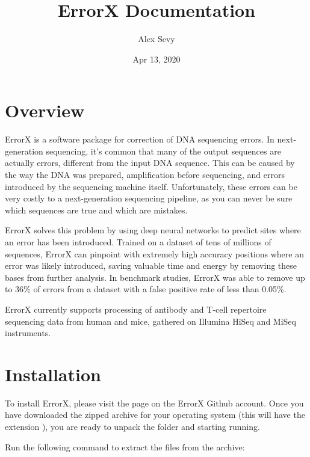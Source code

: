 \documentclass[letterpaper,10pt,english]{sphinxmanual}
\title{ErrorX Documentation}
\date{Apr 13, 2020}
\author{Alex Sevy}
\begin{document}
\pagestyle{empty}
\sphinxmaketitle
\pagestyle{plain}
\sphinxtableofcontents
\pagestyle{normal}
\label{\detokenize{index::doc}}



\chapter{Overview}
\label{\detokenize{index:overview}}
ErrorX is a software package for correction of DNA sequencing errors. In next-generation sequencing, it’s common that many of the output sequences are actually errors, different from the input DNA sequence. This can be caused by the way the DNA was prepared, amplification before sequencing, and errors introduced by the sequencing machine itself. Unfortunately, these errors can be very costly to a next-generation sequencing pipeline, as you can never be sure which sequences are true and which are mistakes.

ErrorX solves this problem by using deep neural networks to predict sites where an error has been introduced. Trained on a dataset of tens of millions of sequences, ErrorX can pinpoint with extremely high accuracy positions where an error was likely introduced, saving valuable time and energy by removing these bases from further analysis. In benchmark studies, ErrorX was able to remove up to 36\% of errors from a dataset with a false positive rate of less than 0.05\%.

ErrorX currently supports processing of antibody and T-cell repertoire sequencing data from human and mice, gathered on Illumina HiSeq and MiSeq instruments.


\chapter{Installation}
\label{\detokenize{index:installation}}
To install ErrorX, please visit the  page on the ErrorX Github account. Once you have downloaded the zipped archive for your operating system (this will have the extension ), you are ready to unpack the folder and starting running.

Run the following command to extract the files from the archive:

\begin{sphinxVerbatim}[commandchars=\\\{\}]
  
\end{sphinxVerbatim}
\end{document}
